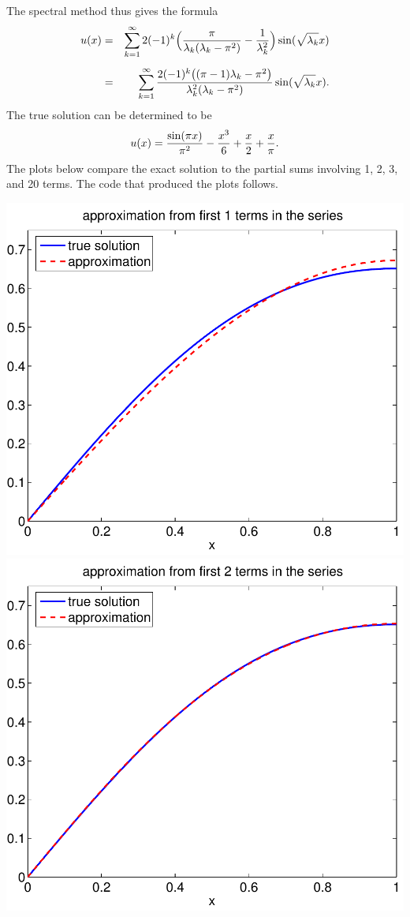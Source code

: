 {\begin{solution}
\begin{enumerate}
The spectral method thus gives the formula
\begin{eqnarray*}
     u(x) &=& \sum_{k=1}^\infty 
                  2(-1)^k\Big({\pi\over \lambda_k(\lambda_k - \pi^2)} 
                               - {1\over \lambda_k^2}\Big)
                              \sin(\sqrt{\lambda_k} x) \\[0.5em]
          &=& \sum_{k=1}^\infty 
                   {2 (-1)^k \big((\pi-1)\lambda_k - \pi^2\big)
                     \over \lambda_k^2(\lambda_k-\pi^2)}
                              \sin(\sqrt{\lambda_k} x).
\end{eqnarray*}
The true solution can be determined to be
\[ u(x) = {\sin(\pi x) \over \pi^2} -{x^3 \over 6} + {x\over 2} + {x\over \pi}.\]
The plots below compare the exact solution to the partial sums involving
1, 2, 3, and 20 terms.  The code that produced the plots follows.
\begin{center}
   \includegraphics[scale=0.4]{bvps2_1}\quad
   \includegraphics[scale=0.4]{bvps2_2}


\end{center}
\end{enumerate}
\end{solution}}
